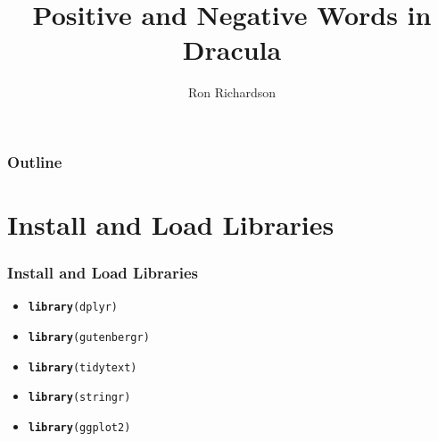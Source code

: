 \documentclass{beamer}\usepackage[]{graphicx}\usepackage[]{color}
\makeatletter
\newcommand{\hlstd}[1]{\textcolor[rgb]{0.345,0.345,0.345}{#1}}%
\newcommand{\hlkwd}[1]{\textcolor[rgb]{0.737,0.353,0.396}{\textbf{#1}}}%
\newenvironment{kframe}{%
 \def\at@end@of@kframe{}%
 \ifinner\ifhmode%
  \def\at@end@of@kframe{\end{minipage}}%
  \begin{minipage}{\columnwidth}%
 \fi\fi%
 \def\FrameCommand##1{\hskip\@totalleftmargin \hskip-\fboxsep
 \colorbox{shadecolor}{##1}\hskip-\fboxsep
     \hskip-\linewidth \hskip-\@totalleftmargin \hskip\columnwidth}%
 \MakeFramed {\advance\hsize-\width
   \@totalleftmargin\z@ \linewidth\hsize
   \@setminipage}}%
 {\par\unskip\endMakeFramed%
 \at@end@of@kframe}
\newenvironment{knitrout}{}{} %
\makeatother
\begin{document}
\title{Positive and Negative Words in Dracula}
\author{Ron Richardson}


\begin{frame}
  \titlepage
\end{frame}

\begin{frame}
  \frametitle{Outline}
    \tableofcontents
\end{frame}


\section{Install and Load Libraries}
\begin{frame}[fragile]
  \frametitle{Install and Load Libraries}
    \begin{itemize}
      \item<1->
\begin{knitrout}
\color{fgcolor}\begin{kframe}
\begin{alltt}
\hlkwd{library}\hlstd{(dplyr)}
\end{alltt}
\end{kframe}
\end{knitrout}
      \item<2->
\begin{knitrout}
\color{fgcolor}\begin{kframe}
\begin{alltt}
\hlkwd{library}\hlstd{(gutenbergr)}
\end{alltt}
\end{kframe}
\end{knitrout}
      \item<3->
\begin{knitrout}
\color{fgcolor}\begin{kframe}
\begin{alltt}
\hlkwd{library}\hlstd{(tidytext)}
\end{alltt}
\end{kframe}
\end{knitrout}
      \item<4->
\begin{knitrout}
\color{fgcolor}\begin{kframe}
\begin{alltt}
\hlkwd{library}\hlstd{(stringr)}
\end{alltt}
\end{kframe}
\end{knitrout}
      \item<5->
\begin{knitrout}
\color{fgcolor}\begin{kframe}
\begin{alltt}
\hlkwd{library}\hlstd{(ggplot2)}
\end{alltt}
\end{kframe}
\end{knitrout}
    \end{itemize}
\end{frame}
\end{document}
